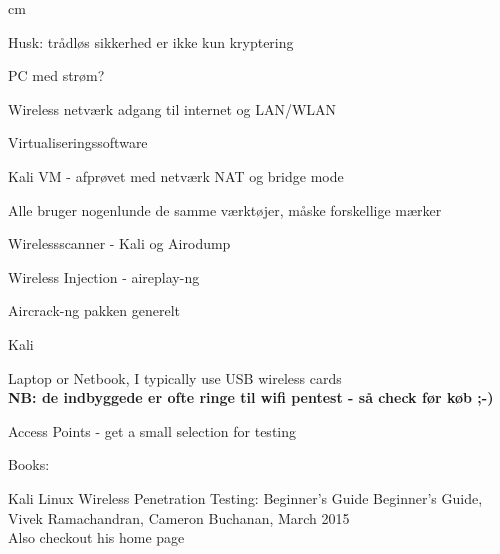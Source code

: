 \documentclass[20pt,landscape,a4paper,footrule]{foils}
\begin{document}
 cm

\centerline{\hlkbig Husk: trådløs sikkerhed er ikke kun kryptering}



\begin{list1}
\item PC med strøm?
\item Wireless netværk adgang til internet og LAN/WLAN
\item Virtualiseringssoftware
\item Kali VM - afprøvet med netværk NAT og bridge mode
\end{list1}




\begin{list1}
\item Alle bruger nogenlunde de samme værktøjer, måske forskellige
  mærker
\begin{list2}
\item Wirelessscanner - Kali og Airodump
\item Wireless Injection - aireplay-ng
\item Aircrack-ng pakken generelt
\end{list2}
\item Kali 
\end{list1}





\begin{list1}
\item Laptop or Netbook, I typically use USB wireless cards\\
{\bf NB: de indbyggede er ofte ringe til wifi pentest - så check før køb ;-)}
\item Access Points - get a small selection for testing
\item Books:
\begin{list2}
\item
Kali Linux Wireless Penetration Testing: Beginner's Guide
Beginner's Guide, Vivek Ramachandran, Cameron Buchanan, March 2015\\
Also checkout his home page 
\end{list2}
\end{list1}
\end{document}
